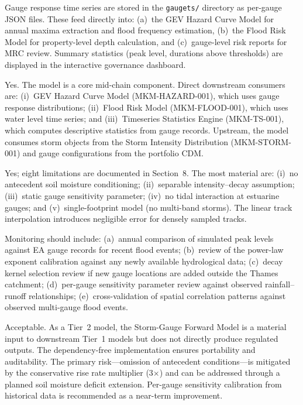 \documentclass[11pt,a4paper]{article}
\begin{document}
Gauge response time series are stored in the \texttt{gaugets/} directory as per-gauge JSON files. These feed directly into: (a)~the GEV Hazard Curve Model for annual maxima extraction and flood frequency estimation, (b)~the Flood Risk Model for property-level depth calculation, and (c)~gauge-level risk reports for MRC review. Summary statistics (peak level, durations above thresholds) are displayed in the interactive governance dashboard.

Yes. The model is a core mid-chain component. Direct downstream consumers are: (i)~GEV Hazard Curve Model (MKM-HAZARD-001), which uses gauge response distributions; (ii)~Flood Risk Model (MKM-FLOOD-001), which uses water level time series; and (iii)~Timeseries Statistics Engine (MKM-TS-001), which computes descriptive statistics from gauge records. Upstream, the model consumes storm objects from the Storm Intensity Distribution (MKM-STORM-001) and gauge configurations from the portfolio CDM.

Yes; eight limitations are documented in Section~8. The most material are: (i)~no antecedent soil moisture conditioning; (ii)~separable intensity--decay assumption; (iii)~static gauge sensitivity parameter; (iv)~no tidal interaction at estuarine gauges; and (v)~single-footprint model (no multi-band storms). The linear track interpolation introduces negligible error for densely sampled tracks.

Monitoring should include: (a)~annual comparison of simulated peak levels against EA gauge records for recent flood events; (b)~review of the power-law exponent calibration against any newly available hydrological data; (c)~decay kernel selection review if new gauge locations are added outside the Thames catchment; (d)~per-gauge sensitivity parameter review against observed rainfall--runoff relationships; (e)~cross-validation of spatial correlation patterns against observed multi-gauge flood events.

Acceptable. As a Tier~2 model, the Storm-Gauge Forward Model is a material input to downstream Tier~1 models but does not directly produce regulated outputs. The dependency-free implementation ensures portability and auditability. The primary risk---omission of antecedent conditions---is mitigated by the conservative rise rate multiplier (3$\times$) and can be addressed through a planned soil moisture deficit extension. Per-gauge sensitivity calibration from historical data is recommended as a near-term improvement.
\end{document}
